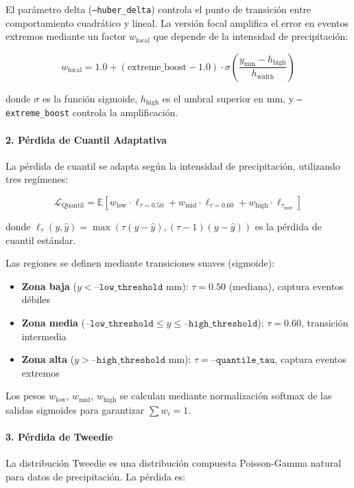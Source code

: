 El parámetro delta (\texttt{--huber\_delta}) controla el punto de transición entre comportamiento cuadrático y lineal. La versión focal amplifica el error en eventos extremos mediante un factor $w_{\text{focal}}$ que depende de la intensidad de precipitación:

\begin{equation}
	w_{\text{focal}} = 1.0 + (\text{extreme\_boost} - 1.0) \cdot \sigma\left(\frac{y_{\text{mm}} - h_{\text{high}}}{h_{\text{width}}}\right)
\end{equation}

donde $\sigma$ es la función sigmoide, $h_{\text{high}}$ es el umbral superior en mm, y \texttt{--extreme\_boost} controla la amplificación.

\paragraph{2. Pérdida de Cuantil Adaptativa}
La pérdida de cuantil se adapta según la intensidad de precipitación, utilizando tres regímenes:

\begin{equation}
	\mathcal{L}_{\text{Quantil}} = \mathbb{E}\left[w_{\text{low}} \cdot \ell_{\tau=0.50} + w_{\text{mid}} \cdot \ell_{\tau=0.60} + w_{\text{high}} \cdot \ell_{\tau_{\text{user}}}\right]
\end{equation}

donde $\ell_\tau(y, \hat{y}) = \max(\tau(y - \hat{y}), (\tau - 1)(y - \hat{y}))$ es la pérdida de cuantil estándar.

Las regiones se definen mediante transiciones suaves (sigmoide):
\begin{itemize}
	\item \textbf{Zona baja} ($y < \texttt{--low\_threshold}$ mm): $\tau = 0.50$ (mediana), captura eventos débiles
	\item \textbf{Zona media} ($\texttt{--low\_threshold} \leq y \leq \texttt{--high\_threshold}$): $\tau = 0.60$, transición intermedia
	\item \textbf{Zona alta} ($y > \texttt{--high\_threshold}$ mm): $\tau = \texttt{--quantile\_tau}$, captura eventos extremos
\end{itemize}

Los pesos $w_{\text{low}}$, $w_{\text{mid}}$, $w_{\text{high}}$ se calculan mediante normalización softmax de las salidas sigmoides para garantizar $\sum w_i = 1$.

\paragraph{3. Pérdida de Tweedie}
La distribución Tweedie es una distribución compuesta Poisson-Gamma natural para datos de precipitación. La pérdida es:

